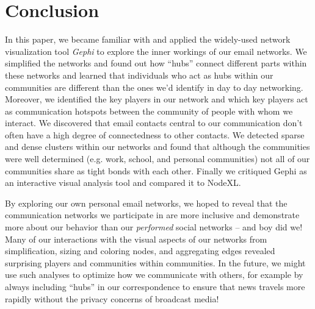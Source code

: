 \documentclass[11pt,letterpaper]{article}
\begin{document}
\section*{Conclusion}

In this paper, we became familiar with and applied the widely-used network visualization tool \textit{Gephi} to explore the inner workings of our email networks. We simplified the networks and found out how ``hubs'' connect different parts within these networks and learned that individuals who act as hubs within our communities are different than the ones we'd identify in day to day networking. Moreover, we identified the key players in our network and which key players act as communication hotspots between the community of people with whom we interact.  We discovered that email contacts central to our communication don't often have a high degree of connectedness to other contacts. We detected sparse and dense clusters within our networks and found that although the communities were well determined (e.g. work, school, and personal communities) not all of our communities share as tight bonds with each other. Finally we critiqued Gephi as an interactive visual analysis tool and compared it to NodeXL.

By exploring our own personal email networks, we hoped to reveal that the communication networks we participate in are more inclusive and demonstrate more about our behavior than our \textit{performed} social networks -- and boy did we! Many of our interactions with the visual aspects of our networks from simplification, sizing and coloring nodes, and aggregating edges revealed surprising players and communities within communities. In the future, we might use such analyses to optimize how we communicate with others, for example by always including ``hubs'' in our correspondence to ensure that news travels more rapidly without the privacy concerns of broadcast media! 



\end{document}
